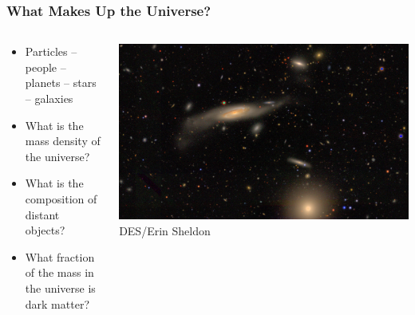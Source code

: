 \documentclass{beamer}
\begin{document}
\frame
{

    \frametitle{What Makes Up the Universe?}


    \begin{columns}
        \begin{column}{0.5\textwidth}
            \begin{itemize}


                \item Particles -- people -- planets -- stars -- galaxies

                \item What is the mass density of the universe?

                \item What is the composition of distant objects?

                \item What fraction of the mass in the universe
                    is dark matter?

            \end{itemize}
        \end{column}
        \begin{column}{0.5\textwidth}
            \begin{center}
                \includegraphics[width=1.2\textwidth, angle=90]{DES0056-5248_gri_crop.jpg}
                \newline
                {\tiny DES/Erin Sheldon}
            \end{center}
        \end{column}
    \end{columns}


}
\end{document}
